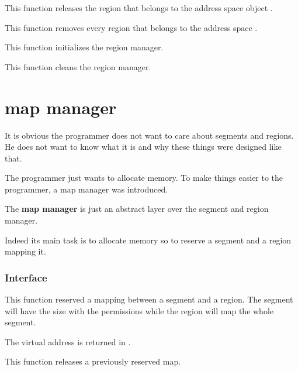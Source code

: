 	 {
	   This function releases the region  that belongs
	   to the address space object .
	 }

	 {
	   This function removes every region that belongs to the
	   address space .
	 }

	 {
	   This function initializes the region manager.
	 }

	 {
	   This function cleans the region manager.
	 }

%
%

\section{map manager}

It is obvious the programmer does not want to care about segments and
regions. He does not want to know what it is and why these things were
designed like that.

The programmer just wants to allocate memory. To make things easier
to the programmer, a map manager was introduced.

The \textbf{map manager} is just an abstract layer over the segment
and region manager.

Indeed its main task is to allocate memory so to reserve a segment
and a region mapping it.

%
%

\subsubsection{Interface}

	 {
	   This function reserved a mapping between a segment and a region.
	   The segment will have the size  with the permissions
	    while the region will map the whole segment.

	   The virtual address is returned in .
	 }

	 {
	   This function releases a previously reserved map.
	 }

